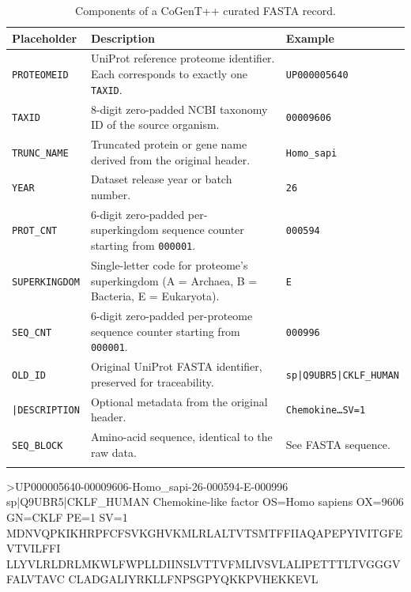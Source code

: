 \begin{table}
  \centering
  \caption{Components of a CoGenT++ curated FASTA record.}
  \begin{tabular}{p{3cm} p{7cm} p{4.3cm}}
		\toprule
		\textbf{Placeholder} & \textbf{Description} & \textbf{Example} \\
    \midrule
		\texttt{PROTEOMEID} & UniProt reference proteome identifier. Each corresponds to exactly one \texttt{TAXID}. & \texttt{UP000005640} \\
		\arrayrulecolor{gray!50}
		\midrule
		\texttt{TAXID} & 8-digit zero-padded NCBI taxonomy ID of the source organism. & \texttt{00009606} \\
		\midrule
		\texttt{TRUNC\_NAME} & Truncated protein or gene name derived from the original header. & \texttt{Homo\_sapi} \\
		\midrule
		\texttt{YEAR} & Dataset release year or batch number. & \texttt{26} \\
		\midrule
		\texttt{PROT\_CNT} & 6-digit zero-padded per-superkingdom sequence counter starting from \texttt{000001}. & \texttt{000594} \\
		\midrule
		\texttt{SUPERKINGDOM} & Single-letter code for proteome's superkingdom (A = Archaea, B = Bacteria, E = Eukaryota). & \texttt{E} \\
		\midrule
		\texttt{SEQ\_CNT} & 6-digit zero-padded per-proteome sequence counter starting from \texttt{000001}. & \texttt{000996} \\
		\midrule
		\texttt{OLD\_ID} & Original UniProt FASTA identifier, preserved for traceability. & \texttt{sp|Q9UBR5|CKLF\_HUMAN} \\
		\midrule
		\texttt{|DESCRIPTION} & Optional metadata from the original header. & \texttt{Chemokine\dots SV=1} \\
		\midrule
		\texttt{SEQ\_BLOCK} & Amino-acid sequence, identical to the raw data. & See FASTA sequence. \\
		\arrayrulecolor{black}
    \bottomrule
  \end{tabular}
  \label{tab:curatedFastaComponents}
\end{table}

\begin{plaintext}
>UP000005640-00009606-Homo_sapi-26-000594-E-000996 sp|Q9UBR5|CKLF_HUMAN Chemokine-like factor OS=Homo sapiens OX=9606 GN=CKLF PE=1 SV=1
MDNVQPKIKHRPFCFSVKGHVKMLRLALTVTSMTFFIIAQAPEPYIVITGFEVTVILFFI
LLYVLRLDRLMKWLFWPLLDIINSLVTTVFMLIVSVLALIPETTTLTVGGGVFALVTAVC
CLADGALIYRKLLFNPSGPYQKKPVHEKKEVL
\end{plaintext}

